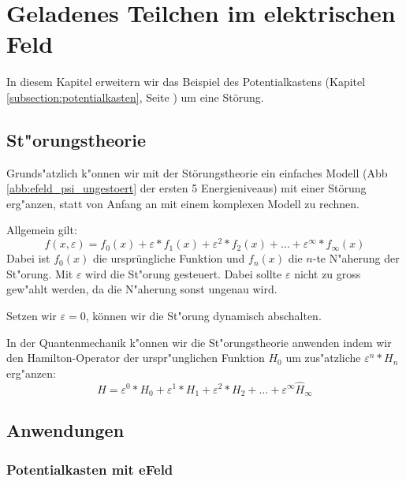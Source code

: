 \chapter{Geladenes Teilchen im elektrischen Feld\label{chapter:efeld}}
\begin{refsection}


In diesem Kapitel erweitern wir das Beispiel des Potentialkastens 
(Kapitel \ref{subsection:potentialkasten}, Seite \pageref{subsection:potentialkasten})
um eine St\"orung.

\section{St"orungstheorie}
Grunds"atzlich k"onnen wir mit der St\"orungstheorie ein einfaches Modell 
(Abb \ref{abb:efeld_psi_ungestoert} der ersten 5 Energieniveaus) 
mit einer St\"orung erg"anzen, statt von Anfang an mit einem komplexen Modell zu rechnen.

Allgemein gilt:
\[
  f(x, \varepsilon) = f_0(x) + \varepsilon*f_1(x) + \varepsilon^2*f_2(x) + \ldots + \varepsilon^\infty*f_\infty(x)
\]
Dabei ist $f_0(x)$ die urspr\"ungliche Funktion und $f_n(x)$ die $n$-te  N"aherung der St"orung.
Mit $\varepsilon$ wird die St"orung gesteuert. Dabei sollte $\varepsilon$ nicht zu gross gew"ahlt werden, 
da die N"aherung sonst ungenau wird. 

Setzen wir $\varepsilon = 0$, k\"onnen wir die St"orung dynamisch abschalten.

In der Quantenmechanik k"onnen wir die St"orungstheorie anwenden indem wir den Hamilton-Operator der 
urspr"unglichen Funktion $H_0$ um zus"atzliche $\varepsilon^n*H_n$ erg"anzen:
\[
  H = \varepsilon^0*H_0 + \varepsilon^1*H_1 + \varepsilon^2*H_2 + \ldots + \varepsilon^\infty \hat H_\infty
\]












\section{Anwendungen}

\subsection{Potentialkasten mit eFeld}



\end{refsection}
